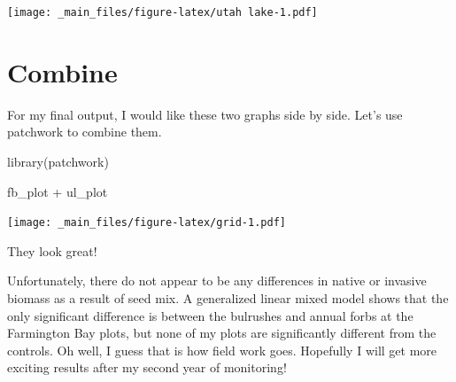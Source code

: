 \documentclass[
]{book}
\newenvironment{Shaded}{\begin{snugshade}}{\end{snugshade}}
\newcommand{\FunctionTok}[1]{\textcolor[rgb]{0.00,0.00,0.00}{#1}}
\newcommand{\NormalTok}[1]{#1}
\newcommand{\SpecialCharTok}[1]{\textcolor[rgb]{0.00,0.00,0.00}{#1}}
\begin{document}
\texttt{[image: \_main\_files/figure-latex/utah lake-1.pdf]}

\hypertarget{combine}{%
\section{Combine}\label{combine}}

For my final output, I would like these two graphs side by side. Let's use patchwork to combine them.

\begin{Shaded}
\begin{Highlighting}[]
\FunctionTok{library}\NormalTok{(patchwork)}

\NormalTok{fb\_plot }\SpecialCharTok{+}\NormalTok{ ul\_plot}
\end{Highlighting}
\end{Shaded}

\texttt{[image: \_main\_files/figure-latex/grid-1.pdf]}

They look great!

Unfortunately, there do not appear to be any differences in native or invasive biomass as a result of seed mix. A generalized linear mixed model shows that the only significant difference is between the bulrushes and annual forbs at the Farmington Bay plots, but none of my plots are significantly different from the controls. Oh well, I guess that is how field work goes. Hopefully I will get more exciting results after my second year of monitoring!

  
\end{document}
